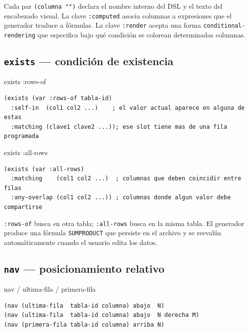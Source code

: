 \documentclass[12pt,a4paper]{report}
\begin{document}
Cada par \texttt{(columna "")} declara el nombre interno del DSL y el texto
del encabezado visual.
La clave \texttt{:computed} asocia columnas a expresiones que el generador
traduce a f\'ormulas.
La clave \texttt{:render} acepta una forma \texttt{conditional-rendering}
que especifica bajo qu\'e condici\'on se colorean determinadas columnas.

\subsection{\texttt{exists} --- condici\'on de existencia}

\begin{sintaxisbox}{exists :rows-of}
\begin{lstlisting}
(exists (var :rows-of tabla-id)
  :self-in  (col1 col2 ...)    ; el valor actual aparece en alguna de estas
  :matching (clave1 clave2 ...)); ese slot tiene mas de una fila programada
\end{lstlisting}
\end{sintaxisbox}

\begin{sintaxisbox}{exists :all-rows}
\begin{lstlisting}
(exists (var :all-rows)
  :matching    (col1 col2 ...)  ; columnas que deben coincidir entre filas
  :any-overlap (col1 col2 ...)) ; columnas donde algun valor debe compartirse
\end{lstlisting}
\end{sintaxisbox}

\texttt{:rows-of} busca en otra tabla; \texttt{:all-rows} busca en la misma tabla.
El generador produce una f\'ormula \texttt{SUMPRODUCT} que persiste en el
archivo y se reevalúa autom\'aticamente cuando el usuario edita los datos.

\subsection{\texttt{nav} --- posicionamiento relativo}

\begin{sintaxisbox}{nav / ultima-fila / primera-fila}
\begin{lstlisting}
(nav (ultima-fila  tabla-id columna) abajo  N)
(nav (ultima-fila  tabla-id columna) abajo  N derecha M)
(nav (primera-fila tabla-id columna) arriba N)
\end{lstlisting}
\end{sintaxisbox}
\end{document}
